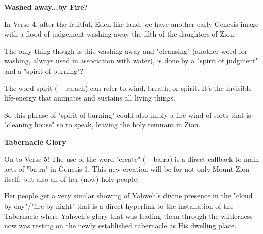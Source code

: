 \documentclass[11pt]{article}
\begin{document}
\vspace{3em}
{\large\bfseries Washed away...by Fire?}
\vspace{1em}

In Verse 4, after the fruitful, Eden-like land, we have another early Genesis image with a flood of judgement washing away the filth of the daughters of Zion.

{\vspace{1em}}

The only thing though is this washing away and "cleansing" (another word for washing, always used in association with water), is done by a "spirit of judgment" and a "spirit of burning"?

{\vspace{1em}}


The word spirit ( – ru.ach) can refer to wind, breath, or spirit. It's the invisible life-energy that animates and sustains all living things.

{\vspace{1em}}

So this phrase of "spirit of burning" could also imply a fire wind of sorts that is "cleaning house" so to speak, leaving the holy remnant in Zion.


\vspace{3em}
{\large\bfseries Tabernacle Glory}
\vspace{1em}



On to Verse 5! The use of the word "create" ( – ba.ra) is a direct callback to main acts of "ba.ra" in Genesis 1.
This new creation will be for not only Mount Zion itself, but also all of her (now) holy people.

{\vspace{1em}}

Her people get a very similar showing of Yahweh's divine presence in the "cloud by day"/"fire by night" that is a direct hyperlink to the installation of the Tabernacle where
Yahweh's glory that was leading them through the wilderness now was resting on the newly established tabernacle as His dwelling place.
\end{document}
